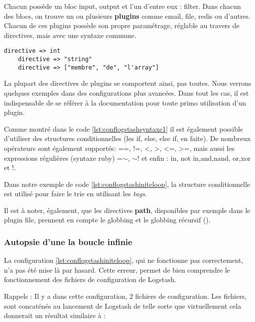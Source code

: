 Chacun possède un bloc input, output et l'un d'entre eux : filter.
Dans chacun des blocs, on trouve un ou plusieurs {\bfseries plugins} comme email, 
file, redis ou d'autres. 
Chacun de ces plugins possède son propre paramétrage, réglable au travers de 
directives, mais avec une syntaxe commune.


\begin{lstlisting}[style=logstash,label={lst:conflogstashsyntaxe1},caption={Syntaxe}]
    directive => int
    directive => "string"
    directive => ["membre", "de", "l'array"]
\end{lstlisting}

La plupart des directives de plugins se comportent ainsi, pas toutes. Nous
verrons quelques exemples dans des configurations plus avancées. Dans tout les cas, il
est indispensable de se référer à la documentation pour toute primo utilisation d'un
plugin.


Comme montré dans le code \ref{lst:conflogstashsyntaxe1} il est également possible 
d'utiliser des structures conditionnelles (les if, else, else if, en faite).
De nombreux opérateurs sont également supportés: ==, !=, <, >, <=, >=, mais aussi
les expressions régulières (syntaxe ruby) =$\sim$, $\sim$! et enfin : in, not in,and,nand,
or,xor et !. 

Dans notre exemple de code \ref{lst:conflogstashiniteloop}, la structure conditionnelle
est utilisé pour faire le trie en utilisant les \emph{tags}.

Il est à noter, également, que les directives \textbf{path}, disponibles par exemple dans
le plugin file, prennent en compte le globbing et le globbing récursif 
().

\subsubsection{Autopsie d'une la boucle infinie}
La configuration \ref{lst:conflogstashiniteloop}, qui ne fonctionne pas
correctement, n'a pas été mise là par hasard. Cette erreur, permet de bien comprendre 
le fonctionnement des fichiers de configuration de Logstash.

Rappels : Il y a dans cette configuration, 2 fichiers de configuration. Les fichiers,
sont concaténés au lancement de Logstash de telle sorte que virtuellement cela donnerait 
un résultat similaire à :


